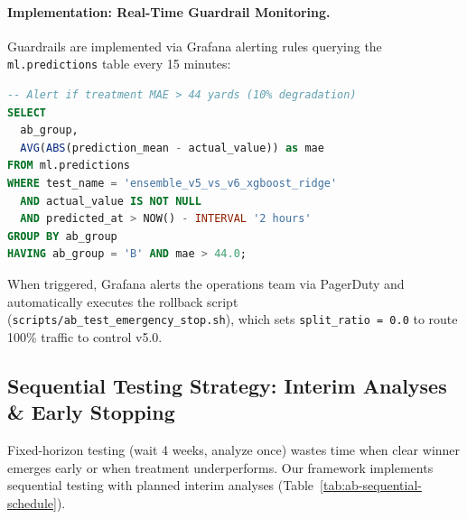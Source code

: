 \paragraph{Implementation: Real-Time Guardrail Monitoring.}
Guardrails are implemented via Grafana alerting rules querying the \texttt{ml.predictions} table every 15 minutes:

\begin{lstlisting}[language=SQL, style=codestyle, caption={Real-time MAE degradation guardrail query}]
-- Alert if treatment MAE > 44 yards (10% degradation)
SELECT
  ab_group,
  AVG(ABS(prediction_mean - actual_value)) as mae
FROM ml.predictions
WHERE test_name = 'ensemble_v5_vs_v6_xgboost_ridge'
  AND actual_value IS NOT NULL
  AND predicted_at > NOW() - INTERVAL '2 hours'
GROUP BY ab_group
HAVING ab_group = 'B' AND mae > 44.0;
\end{lstlisting}

When triggered, Grafana alerts the operations team via PagerDuty and automatically executes the rollback script (\texttt{scripts/ab\_test\_emergency\_stop.sh}), which sets \texttt{split\_ratio = 0.0} to route 100\% traffic to control v5.0.

\subsection{Sequential Testing Strategy: Interim Analyses \& Early Stopping}

Fixed-horizon testing (wait 4 weeks, analyze once) wastes time when clear winner emerges early or when treatment underperforms. Our framework implements sequential testing with planned interim analyses (Table~\ref{tab:ab-sequential-schedule}).

